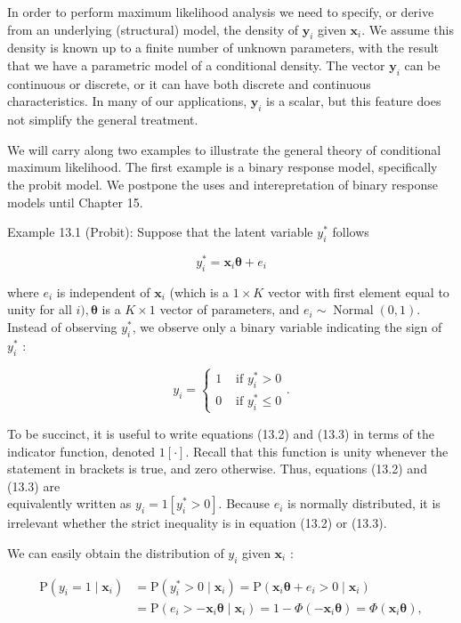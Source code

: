 \documentclass[10pt]{article}
\begin{document}
In order to perform maximum likelihood analysis we need to specify, or derive from an underlying (structural) model, the density of $\mathbf{y}_{i}$ given $\mathbf{x}_{i}$. We assume this density is known up to a finite number of unknown parameters, with the result that we have a parametric model of a conditional density. The vector $\mathbf{y}_{i}$ can be continuous or discrete, or it can have both discrete and continuous characteristics. In many of our applications, $\mathbf{y}_{i}$ is a scalar, but this feature does not simplify the general treatment.

We will carry along two examples to illustrate the general theory of conditional maximum likelihood. The first example is a binary response model, specifically the probit model. We postpone the uses and interepretation of binary response models until Chapter 15.

Example 13.1 (Probit): Suppose that the latent variable $y_{i}^{*}$ follows


\begin{equation*}
y_{i}^{*}=\mathbf{x}_{i} \boldsymbol{\theta}+e_{i} \tag{13.1}
\end{equation*}


where $e_{i}$ is independent of $\mathbf{x}_{i}$ (which is a $1 \times K$ vector with first element equal to unity for all $i), \boldsymbol{\theta}$ is a $K \times 1$ vector of parameters, and $e_{i} \sim \operatorname{Normal}(0,1)$. Instead of observing $y_{i}^{*}$, we observe only a binary variable indicating the sign of $y_{i}^{*}$ :

\[
y_{i}=\left\{\begin{array}{ll}
1 & \text { if } y_{i}^{*}>0  \tag{13.2}\\
0 & \text { if } y_{i}^{*} \leq 0
\end{array} .\right.
\]

To be succinct, it is useful to write equations (13.2) and (13.3) in terms of the indicator function, denoted $1[\cdot]$. Recall that this function is unity whenever the statement in brackets is true, and zero otherwise. Thus, equations (13.2) and (13.3) are\\
equivalently written as $y_{i}=1\left[y_{i}^{*}>0\right]$. Because $e_{i}$ is normally distributed, it is irrelevant whether the strict inequality is in equation (13.2) or (13.3).

We can easily obtain the distribution of $y_{i}$ given $\mathbf{x}_{i}$ :


\begin{align*}
\mathrm{P}\left(y_{i}=1 \mid \mathbf{x}_{i}\right) & =\mathrm{P}\left(y_{i}^{*}>0 \mid \mathbf{x}_{i}\right)=\mathrm{P}\left(\mathbf{x}_{i} \boldsymbol{\theta}+e_{i}>0 \mid \mathbf{x}_{i}\right) \\
& =\mathrm{P}\left(e_{i}>-\mathbf{x}_{i} \boldsymbol{\theta} \mid \mathbf{x}_{i}\right)=1-\Phi\left(-\mathbf{x}_{i} \boldsymbol{\theta}\right)=\Phi\left(\mathbf{x}_{i} \boldsymbol{\theta}\right), \tag{13.4}
\end{align*}
\end{document}
